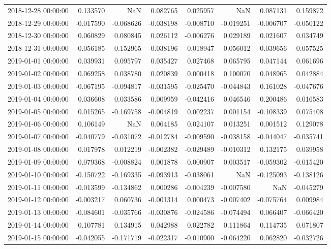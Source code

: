 \begin{tabular}{lrrrrrrr}
2018-12-28 00:00:00 & 0.133570 & NaN & 0.082765 & 0.025957 & NaN & 0.087131 & 0.159872 \\
2018-12-29 00:00:00 & -0.017590 & -0.068626 & -0.038198 & -0.008710 & -0.019251 & -0.006707 & -0.050122 \\
2018-12-30 00:00:00 & 0.060829 & 0.080845 & 0.026112 & -0.006276 & 0.029189 & 0.021607 & 0.034749 \\
2018-12-31 00:00:00 & -0.056185 & -0.152965 & -0.038196 & -0.018947 & -0.056012 & -0.039656 & -0.057525 \\
2019-01-01 00:00:00 & 0.039931 & 0.095797 & 0.035427 & 0.027468 & 0.065795 & 0.047144 & 0.061696 \\
2019-01-02 00:00:00 & 0.069258 & 0.038780 & 0.020839 & 0.000418 & 0.100070 & 0.048965 & 0.042884 \\
2019-01-03 00:00:00 & -0.067195 & -0.094817 & -0.031595 & -0.025470 & -0.044843 & 0.161028 & -0.047676 \\
2019-01-04 00:00:00 & 0.036608 & 0.033586 & 0.009959 & -0.042416 & 0.046546 & 0.200486 & 0.016583 \\
2019-01-05 00:00:00 & 0.015265 & -0.169758 & -0.004819 & 0.002237 & 0.001154 & -0.108339 & 0.075408 \\
2019-01-06 00:00:00 & 0.106149 & NaN & 0.064185 & 0.024107 & 0.013251 & 0.001512 & 0.129078 \\
2019-01-07 00:00:00 & -0.040779 & -0.031072 & -0.012784 & -0.009590 & -0.038158 & -0.044047 & -0.035741 \\
2019-01-08 00:00:00 & 0.017978 & 0.012219 & -0.002382 & -0.029489 & -0.010312 & 0.132175 & 0.039958 \\
2019-01-09 00:00:00 & 0.079368 & -0.008824 & 0.001878 & 0.000907 & 0.003517 & -0.059302 & -0.015420 \\
2019-01-10 00:00:00 & -0.150722 & -0.169335 & -0.093913 & -0.038061 & NaN & -0.125093 & -0.138126 \\
2019-01-11 00:00:00 & -0.013599 & -0.134862 & 0.000286 & -0.004239 & -0.007580 & NaN & -0.045279 \\
2019-01-12 00:00:00 & -0.003217 & 0.060736 & -0.001314 & 0.000473 & -0.007402 & -0.075764 & 0.009984 \\
2019-01-13 00:00:00 & -0.084601 & -0.035766 & -0.030876 & -0.024586 & -0.074494 & 0.066407 & -0.066420 \\
2019-01-14 00:00:00 & 0.107781 & 0.134915 & 0.042988 & 0.022782 & 0.111864 & 0.114735 & 0.071807 \\
2019-01-15 00:00:00 & -0.042055 & -0.171719 & -0.022317 & -0.010900 & -0.064220 & 0.062820 & -0.032726 \\

\end{tabular}
